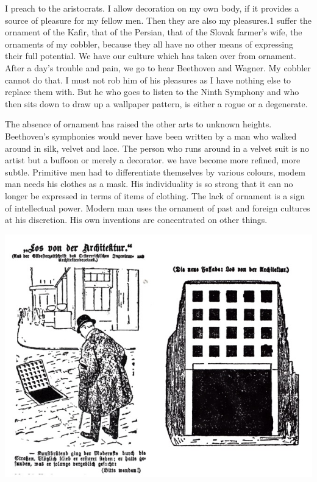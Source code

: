 \documentclass[a4paper]{article}
\begin{document}
I preach to the aristocrats. I allow decoration on my own body, if it provides a source of pleasure for my fellow men. Then they are also my pleasures.1 suffer the ornament of the Kafir, that of the Persian, that of the Slovak farmer’s wife, the ornaments of my cobbler, because they all have no other means of expressing their full potential. We have our culture which has taken over from ornament. After a day’s trouble and pain, we go to hear Beethoven and Wagner. My cobbler cannot do that. I must not rob him of his pleasures as I have nothing else to replace them with. But he who goes to listen to the Ninth Symphony and who then sits down to draw up a wallpaper pattern, is either a rogue or a degenerate.

The absence of ornament has raised the other arts to unknown heights. Beethoven’s symphonies would never have been written by a man who walked around in silk, velvet and lace. The person who runs around in a velvet suit is no artist but a buffoon or merely a decorator. we have become more refined, more subtle. Primitive men had to differentiate themselves by various colours, modem man needs his clothes as a mask. His individuality is so strong that it can no longer be expressed in terms of items of clothing. The lack of ornament is a sign of intellectual power. Modern man uses the ornament of past and foreign cultures at his discretion. His own inventions are concentrated on other things.

\includegraphics[width=0.7\linewidth]{./figures/caricature_loos.jpg} %
\end{document}
